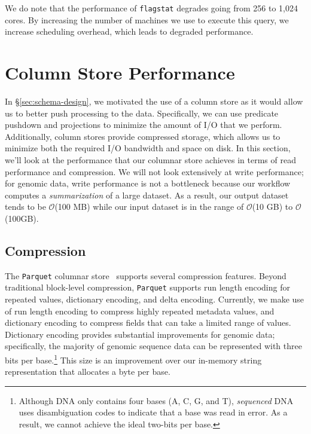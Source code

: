 \documentclass[masters]{ucbthesis}
\begin{document}
We do note that the performance of \texttt{flagstat} degrades going from 256 to 1,024 cores. By increasing the
number of machines we use to execute this query, we increase scheduling overhead, which leads to degraded
performance.

\section{Column Store Performance}
\label{sec:column-store-perf}

In \S\ref{sec:schema-design}, we motivated the use of a column store as it would allow us to better push processing to
the data. Specifically, we can use predicate pushdown and projections to minimize the amount of I/O that we
perform. Additionally, column stores provide compressed storage, which allows us to minimize both the required
I/O bandwidth and space on disk. In this section, we'll look at the performance that our columnar store achieves
in terms of read performance and compression. We will not look extensively at write performance; for genomic
data, write performance is not a bottleneck because our workflow computes a \emph{summarization} of a large
dataset. As a result, our output dataset tends to be $\mathcal{O}$(100 MB) while our input dataset is in the range of
$\mathcal{O}$(10 GB) to $\mathcal{O}$(100GB).

\subsection{Compression}
\label{sec:compression}

The \texttt{Parquet} columnar store~\cite{parquet} supports several compression features. Beyond traditional block-level
compression, \texttt{Parquet} supports run length encoding for repeated values, dictionary encoding, and delta
encoding. Currently, we make use of run length encoding to compress highly repeated metadata values,
and dictionary encoding to compress fields that can take a limited range of values. Dictionary encoding provides
substantial improvements for genomic data; specifically, the majority of genomic sequence data can be
represented with three bits per base.\footnote{Although DNA only contains four bases (A, C, G, and T),
\emph{sequenced} DNA uses disambiguation codes to indicate that a base was read in error. As a result, we
cannot achieve the ideal two-bits per base.} This size is an improvement over our in-memory string representation
that allocates a byte per base.
\end{document}
